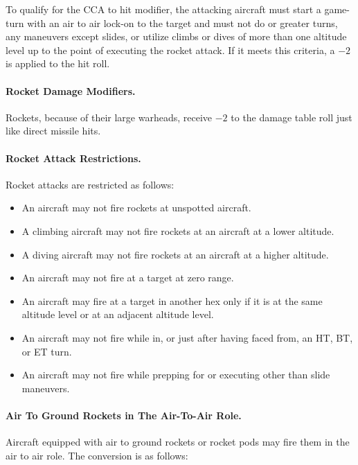 To qualify for the CCA to hit modifier, the attacking aircraft must start a game-turn with an air to air lock-on to the target and must not do  or greater turns, any maneuvers except slides, or utilize climbs or dives of more than one altitude level up to the point of executing the rocket attack. If it meets this criteria, a $-2$ is applied to the hit roll.

\paragraph{Rocket Damage Modifiers.} Rockets, because of their large warheads, receive $-2$ to the damage table roll just like direct missile hits.

\paragraph{Rocket Attack Restrictions.} Rocket attacks are restricted as follows:

\begin{itemize}

    \item An aircraft may not fire rockets at unspotted aircraft.

    \item A climbing aircraft may not fire rockets at an aircraft at a lower altitude.

    \item A diving aircraft may not fire rockets at an aircraft at a higher altitude.

    \item An aircraft may not fire at a target at zero range.

    \item An aircraft  may fire at a target in another hex only if it is at the same altitude level or at an adjacent altitude level.

    \item An aircraft may not fire while in, or just after having faced from, an HT, BT, or ET turn.

    \item An aircraft may not fire while prepping for or executing other than slide maneuvers.

\end{itemize}

\paragraph{Air To Ground Rockets in The Air-To-Air Role.} Aircraft equipped with air to ground rockets or rocket pods may fire them in the air to air role. The conversion is as follows:

